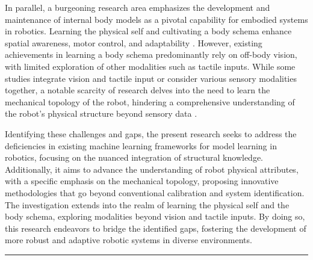 \documentclass[12pt, a4paper]{article}
\begin{document}
In parallel, a burgeoning research area emphasizes the development and maintenance of internal body models as a pivotal capability for embodied systems in robotics. Learning the physical self and cultivating a body schema enhance spatial awareness, motor control, and adaptability \cite{Nguyen2021Sensorimotorrepresentationlearning,Hoffmann2010Bodyschemarobotics}. However, existing achievements in learning a body schema predominantly rely on off-body vision, with limited exploration of other modalities such as tactile inputs. While some studies integrate vision and tactile input or consider various sensory modalities together, a notable scarcity of research delves into the need to learn the mechanical topology of the robot, hindering a comprehensive understanding of the robot's physical structure beyond sensory data \cite{Hersch2008Onlinelearningbody,MartinezCantin2010Bodyschemaacquisition,Hart2011roboticmodelecological,Lipson2019Taskagnosticself,Chen2022Fullybodyvisual,Li2015Towardsbodyschema,Zenha2018Incrementaladaptationrobot,Gama2021Goaldirectedtactile,Fuke2007BodyImageConstructed,Malinovska2022connectionistmodelassociating,Nguyen2019Reachingdevelopmentvisuo,Pugach2019BrainInspiredCoding,Lanillos2016Yieldingselfperception,Bongard2006Automatedsynthesisbody,Bongard2006Resilientmachinescontinuous}.

Identifying these challenges and gaps, the present research seeks to address the deficiencies in existing machine learning frameworks for model learning in robotics, focusing on the nuanced integration of structural knowledge. Additionally, it aims to advance the understanding of robot physical attributes, with a specific emphasis on the mechanical topology, proposing innovative methodologies that go beyond conventional calibration and system identification. The investigation extends into the realm of learning the physical self and the body schema, exploring modalities beyond vision and tactile inputs. By doing so, this research endeavors to bridge the identified gaps, fostering the development of more robust and adaptive robotic systems in diverse environments.

\hrule
\end{document}
